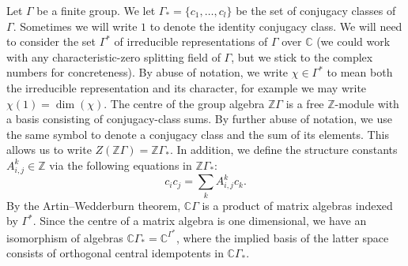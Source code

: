 \documentclass[10pt]{article}
\theoremstyle{definition}
\begin{document}
Let $\Gamma$ be a finite group. We let $\Gamma_* = \{c_1, \ldots, c_l\}$ be the set of conjugacy classes of $\Gamma$. Sometimes we will write $1$ to denote the identity conjugacy class. We will need to consider the set $\Gamma^*$ of irreducible representations of $\Gamma$ over $\mathbb{C}$ (we could work with any characteristic-zero splitting field of $\Gamma$, but we stick to the complex numbers for concreteness). By abuse of notation, we write $\chi \in \Gamma^*$ to mean both the irreducible representation and its character, for example we may write $\chi(1) = \dim(\chi)$. The centre of the group algebra $\mathbb{Z}\Gamma$ is a free $\mathbb{Z}$-module with a basis consisting of conjugacy-class sums. By further abuse of notation, we use the same symbol to denote a conjugacy class and the sum of its elements. This allows us to write $Z(\mathbb{Z}\Gamma) = \mathbb{Z}\Gamma_*$. In addition, we define the structure constants $A_{i,j}^k \in \mathbb{Z}$ via the following equations in $\mathbb{Z}\Gamma_*$:
\begin{equation} \label{gp_alg_centre_str_consts}
c_i c_j = \sum_k A_{i,j}^k c_k.
\end{equation}
By the Artin--Wedderburn theorem, $\mathbb{C}\Gamma$ is a product of matrix algebras indexed by $\Gamma^*$. Since the centre of a matrix algebra is one dimensional, we have an isomorphism of algebras $\mathbb{C}\Gamma_* = \mathbb{C}^{\Gamma^*}$, where the implied basis of the latter space consists of orthogonal central idempotents in $\mathbb{C}\Gamma_*$.
\end{document}
